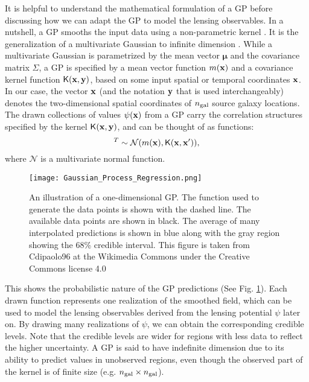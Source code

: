 It is helpful to understand the mathematical formulation of a GP 
before discussing how we can adapt the GP to model the lensing observables. 
In a nutshell, a GP smooths the input data using a non-parametric kernel
\citep{Hastie1990}. 
It is the generalization of a multivariate Gaussian 
to infinite dimension \citep{Rasmussen2006}. 
While a multivariate Gaussian is parametrized by  
the mean vector $\mathbf{\mu}$ and the covariance matrix $\Sigma$, 
a GP is specified by a mean vector function $m(\mathbf{x})$ and a
covariance kernel function $\mathsf{K}(\mathbf{x}, \mathbf{y})$, based on some input spatial or
temporal coordinates $\mathbf{x}$. In our case, the vector $\mathbf{x}$ (and the
 notation $\mathbf{y}$ that is used interchangeably) denotes the
two-dimensional spatial coordinates of $n_{\rm gal}$ source galaxy locations. 
The drawn collections of values $\psi(\mathbf{x})$ from a GP carry the correlation structures
specified by the kernel $\mathsf{K}(\mathbf{x}, \mathbf{y})$, and can be thought of as
functions: 
\begin{equation}
	[\psi_1(\xv), \psi_2(\xv) \ldots, \psi_m(\xv) ]^T \sim \mathcal{N}(m(\xv),
	\kerngp(\xv, \xv')),
		\label{eq:GP}
\end{equation}
where $\mathcal{N}$ is a multivariate normal function.
\begin{figure}
	\centering
	\texttt{[image: Gaussian\_Process\_Regression.png]}
	\caption{An illustration of a one-dimensional GP. The
		function used to generate the data points 
		is shown with the dashed line. The available data points are shown in
		black. The average of many interpolated predictions is shown in blue
		along with the gray region showing the 68\% 
		credible interval. This figure is taken from Cdipaolo96 at 
		the Wikimedia Commons under the Creative Commons license 4.0
\label{fig:one_d_gaussian_process}}
\end{figure}
This shows the probabilistic nature of the GP predictions
(See Fig. \ref{fig:one_d_gaussian_process}).
Each drawn function represents one realization of the smoothed
field, which can be used to model the lensing observables derived 
from the lensing potential $\psi$ later on. 
By drawing many realizations of $\psi$, we can obtain the
corresponding credible levels.
Note that the credible levels are wider for regions with less data to reflect
the higher uncertainty. A GP is said to have indefinite dimension due to its ability to
predict values in unobserved regions, even though the 
observed part of the kernel is of finite size (e.g. $n_{\rm gal} \times n_{\rm gal}$). 

